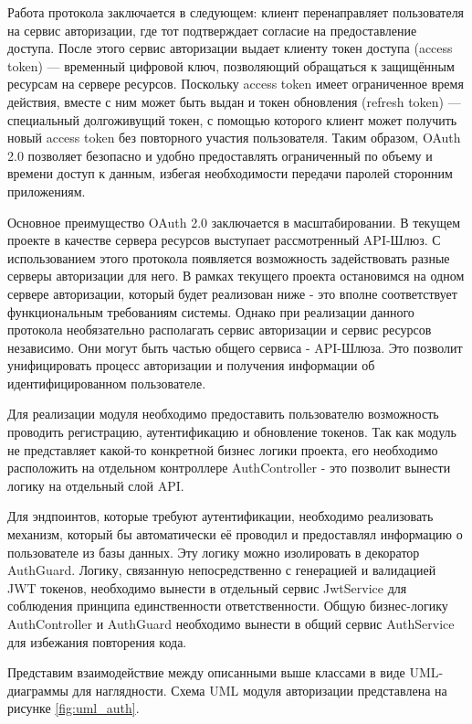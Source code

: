 	Работа протокола заключается в следующем: клиент перенаправляет пользователя на сервис авторизации, где тот подтверждает согласие на предоставление доступа. После этого сервис авторизации выдает клиенту токен доступа (access token) — временный цифровой ключ, позволяющий обращаться к защищённым ресурсам на сервере ресурсов. Поскольку access token имеет ограниченное время действия, вместе с ним может быть выдан и токен обновления (refresh token) — специальный долгоживущий токен, с помощью которого клиент может получить новый access token без повторного участия пользователя. Таким образом, OAuth 2.0 позволяет безопасно и удобно предоставлять ограниченный по объему и времени доступ к данным, избегая необходимости передачи паролей сторонним приложениям.

	Основное преимущество OAuth 2.0 заключается в масштабировании. В текущем проекте в качестве сервера ресурсов выступает рассмотренный API-Шлюз. С использованием этого протокола появляется возможность задействовать разные серверы авторизации для него. В рамках текущего проекта остановимся на одном сервере авторизации, который будет реализован ниже - это вполне соответствует функциональным требованиям системы. Однако при реализации данного протокола необязательно располагать сервис авторизации и сервис ресурсов независимо. Они могут быть частью общего сервиса - API-Шлюза. Это позволит унифицировать процесс авторизации и получения информации об идентифицированном пользователе.
	
	Для реализации модуля необходимо предоставить пользователю возможность проводить регистрацию, аутентификацию и обновление токенов. Так как модуль не представляет какой-то конкретной бизнес логики проекта, его необходимо расположить на отдельном контроллере AuthController - это позволит вынести логику на отдельный слой API.
	
	Для эндпоинтов, которые требуют аутентификации, необходимо реализовать механизм, который бы автоматически её проводил и предоставлял информацию о пользователе из базы данных. Эту логику можно изолировать в декоратор AuthGuard. Логику, связанную непосредственно с генерацией и валидацией JWT токенов, необходимо вынести в отдельный сервис JwtService для соблюдения принципа единственности ответственности. Общую бизнес-логику AuthController и AuthGuard необходимо вынести в общий сервис AuthService для избежания повторения кода.

	Представим взаимодействие между описанными выше классами в виде UML-диаграммы для наглядности. Схема UML модуля авторизации представлена на рисунке \ref{fig:uml_auth}.

